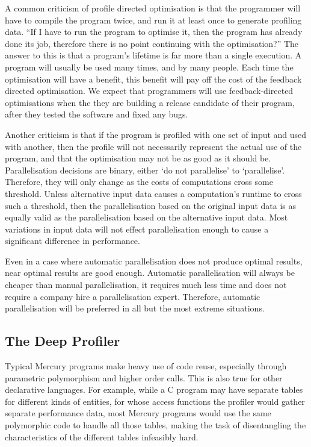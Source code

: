 
A common criticism of profile directed optimisation is that the programmer will
have to compile the program twice,
and run it at least once to generate profiling data.
``If I have to run the program to optimise it, then the program has
already done its job,
therefore there is no point continuing with the optimisation?''
The answer to this is that a program's lifetime is far more than a
single execution.
A program will usually be used many times, and by many people.
Each time the optimisation will have a benefit,
this benefit will pay off the cost of the feedback directed optimisation.
We expect that programmers will use feedback-directed optimisations when the
they are building a release candidate of their program,
after they tested the software and fixed any bugs.

Another criticism is that if the program is profiled with one set of input and
used with another,
then the profile will not necessarily represent the actual use
of the program,
and that the optimisation may not be as good as it should be.
Parallelisation decisions are binary,
either `do not parallelise' to `parallelise'.
Therefore,
they will only change as the costs of computations cross some threshold.
Unless alternative input data causes a computation's runtime to cross such a
threshold,
then the parallelisation based on the original input data is 
as equally valid as the parallelisation based on the alternative input data.
Most variations in input data will not  
effect parallelisation enough to cause a significant difference in performance.

Even in a case where automatic parallelisation does not produce optimal
results,
near optimal results are good enough.
Automatic parallelisation will always be cheaper than manual
parallelisation,
it requires much less time and does not require a company hire a
parallelisation expert.
Therefore, automatic parallelisation will be preferred in all but the most
extreme situations.

\subsection{The Deep Profiler}
\label{sec:backgnd_deep}

Typical Mercury programs make heavy use of code reuse,
especially through parametric polymorphism and higher order calls.
This is also true for other declarative languages.
For example, while a C program may have
separate tables for different kinds of entities,
for whose access functions
the profiler would gather separate performance data,
most Mercury programs would use
the same polymorphic code to handle all those tables,
making the task of disentangling the characteristics of the different tables
infeasibly hard.

